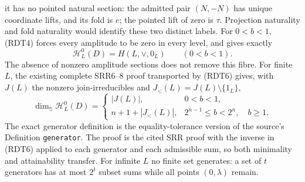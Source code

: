 it has no pointed natural section: the admitted pair $(N,-N)$ has
unique coordinate lifts, and its fold is $e$; the pointed lift of
zero is $\tau$. Projection naturality and fold naturality would
identify these two distinct labels. For $0<b<1$, (RDT4) forces
every amplitude to be zero in every level, and gives exactly
\begin{equation}\tag{RDT7}
\mathcal H_L^0(D)=H(L,\vee,0_L)
\qquad(0<b<1).
\end{equation}
The absence of nonzero amplitude sections does not remove this fibre.
For finite $L$, the existing complete SRR6--8 proof transported by
(RDT6) gives, with $J(L)$ the nonzero join-irreducibles and
$J_{<}(L)=J(L)\setminus\{1_L\}$,
\begin{equation}\tag{RDT8}
\dim_{\mathbb S}\mathcal H_L^0(D)=
\begin{cases}
|J(L)|,&0<b<1,\\
n+1+|J_{<}(L)|,&2^{n-1}\le b<2^n,\quad b\ge1.
\end{cases}
\end{equation}
The exact generator definition is the equality-tolerance version of
the source's Definition \texttt{generator}. The proof is the cited
SRR proof with the inverse in (RDT6) applied to each generator and
each admissible sum, so both minimality and attainability transfer.
For infinite $L$ no finite set generates: a set of $t$ generators
has at most $2^t$ subset sums while all points $(0,\lambda)$ remain.
